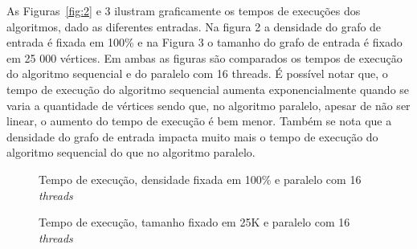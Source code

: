 \documentclass[12pt]{article}
\begin{document}
As Figuras~\ref{fig:2} e 3 ilustram graficamente os tempos de execuções dos algoritmos, dado as diferentes entradas. Na figura 2 a densidade do grafo de entrada é fixada em 100\% e na Figura 3 o tamanho do grafo de entrada é fixado em 25 000 vértices. Em ambas as figuras são comparados os tempos de execução do algoritmo sequencial e do paralelo com 16 threads. É possível notar que, o tempo de execução do algoritmo sequencial aumenta exponencialmente quando se varia a quantidade de vértices sendo que, no algoritmo paralelo, apesar de não ser linear, o aumento do tempo de execução é bem menor. Também se nota que a densidade do grafo de entrada impacta muito mais o tempo de execução do algoritmo sequencial do que no algoritmo paralelo.

\begin{figure}[htp!]
    \centering
    \begin{minipage}{.48\textwidth}
        \centering
        \resizebox{\textwidth}{!}
        {
		}
        \caption{Tempo de execução, densidade fixada em 100\% e paralelo com 16 \emph{threads}}
        \label{fig:2}
    \end{minipage}\hfill%
    \begin{minipage}{.48\textwidth}
        \centering
        \resizebox{\textwidth}{!}
        {
		}
        \caption{Tempo de execução, tamanho fixado em 25K e paralelo com 16 \emph{threads}}
        \label{fig:3}
    \end{minipage}
\end{figure}
\end{document}
